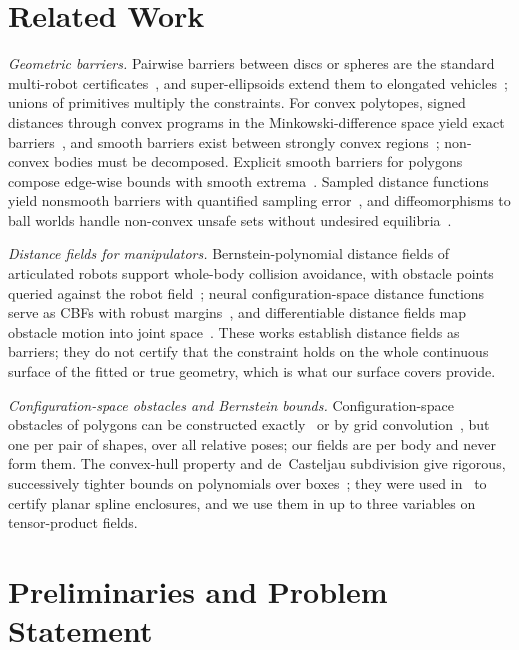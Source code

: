 \documentclass[journal]{IEEEtran}
\theoremstyle{definition}
\begin{document}
\section{Related Work}\label{sec:related}

\emph{Geometric barriers.} Pairwise barriers between discs or spheres are the standard multi-robot
certificates~\cite{wang2017safety}, and super-ellipsoids extend them to elongated
vehicles~\cite{wang2017quadrotors}; unions of primitives multiply the constraints. For convex
polytopes, signed distances through convex programs in the Minkowski-difference space yield exact
barriers~\cite{chen2025minkowski,chen2026exact}, and smooth barriers exist between strongly convex
regions~\cite{thirugnanam2025strongly}; non-convex bodies must be decomposed. Explicit smooth
barriers for polygons compose edge-wise bounds with smooth extrema~\cite{wu2025optimization}.
Sampled distance functions yield nonsmooth barriers with quantified sampling
error~\cite{lutkus2025sampling}, and diffeomorphisms to ball worlds handle non-convex unsafe sets
without undesired equilibria~\cite{notomista2021nonconvex}.

\emph{Distance fields for manipulators.} Bernstein-polynomial distance fields of articulated robots
support whole-body collision avoidance, with obstacle points queried against the robot
field~\cite{li2024representing}; neural configuration-space distance functions serve as CBFs with
robust margins~\cite{long2025neural}, and differentiable distance fields map obstacle motion into
joint space~\cite{chi2024safe}. These works establish distance fields as barriers; they do not
certify that the constraint holds on the whole continuous surface of the fitted or true geometry,
which is what our surface covers provide.

\emph{Configuration-space obstacles and Bernstein bounds.} Configuration-space obstacles of polygons
can be constructed exactly~\cite{lozanoperez1983spatial,latombe1991robot} or by grid
convolution~\cite{kavraki1995fft}, but one per pair of shapes, over all relative poses; our fields
are per body and never form them. The
convex-hull property and de~Casteljau subdivision give rigorous, successively tighter bounds on
polynomials over boxes~\cite{farin2002curves,sherbrooke1993computation}; they were used
in~\cite{jo2027semantic} to certify planar spline enclosures, and we use them in up to three
variables on tensor-product fields.

\section{Preliminaries and Problem Statement}\label{sec:prelim}
\end{document}
